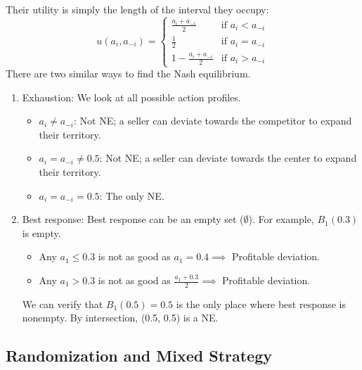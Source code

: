\documentclass[notitlepage]{article}
\begin{document}
\begin{itemize}
    \begin{figure}[h]
    \centering
    \resizebox{0.5\textwidth}{!}{
    
    }
    \end{figure}

    Their utility is simply the length of the interval they occupy:
    \[
    u(a_i, a_{-i}) = 
    \begin{cases}
        \frac{a_i + a_{-i}}{2} &\text{if } a_i < a_{-i} \\
        \frac{1}{2} &\text{if } a_i = a_{-i} \\
        1 - \frac{a_i + a_{-i}}{2} &\text{if } a_i > a_{-i}
    \end{cases}
    \]
    There are two similar ways to find the Nash equilibrium.

    \begin{enumerate}
        \item Exhaustion: We look at all possible action profiles.
        \begin{itemize}
            \item \(a_i \ne a_{-i}\): Not NE; a seller can deviate towards the competitor to expand their territory.
            \item \(a_i = a_{-i} \ne 0.5\): Not NE; a seller can deviate towards the center to expand their territory.
            \item \(a_i = a_{-i} = 0.5\): The only NE.
        \end{itemize}
        \item Best response: Best response can be an empty set (\(\emptyset\)). For example, \(B_1(0.3)\) is empty.
        \begin{itemize}
            \item Any \(a_1 \le 0.3\) is not as good as \(a_1 = 0.4 \implies\) Profitable deviation.
            \item Any \(a_1 > 0.3\) is not as good as \(\frac{a_1+0.3}{2} \implies\) Profitable deviation.
        \end{itemize}
        We can verify that \(B_1(0.5) = 0.5\) is the only place where best response is nonempty. By intersection, (0.5, 0.5) is a NE.
    \end{enumerate}
\end{itemize}

\subsection{Randomization and Mixed Strategy}
\end{document}
